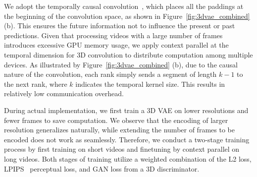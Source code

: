 We adopt the temporally causal convolution~\citep{yu2023language}, which places all the paddings at the beginning of the convolution space, as shown in Figure~\ref{fig:3dvae_combined} (b). 
This ensures the future information not to influence the present or past predictions. 
Given that processing videos with a large number of frames introduces excessive GPU memory usage, we apply context parallel at the temporal dimension for 3D convolution to distribute computation among multiple devices. 
As illustrated by Figure~\ref{fig:3dvae_combined} (b), due to the causal nature of the convolution, each rank simply sends a segment of length $k-1$ to the next rank, where $k$ indicates the temporal kernel size. 
This results in relatively low communication overhead.

During actual implementation, we first train a 3D VAE on lower resolutions and fewer frames to save computation. 
We observe that the encoding of larger resolution generalizes naturally, while extending the number of frames to be encoded does not work as seamlessly. 
Therefore, we conduct a two-stage training process by first training on short videos and finetuning by context parallel on long videos. 
Both stages of training utilize a weighted combination of the L2 loss, LPIPS~\citep{zhang2018unreasonable} perceptual loss, and GAN loss from a 3D discriminator.
